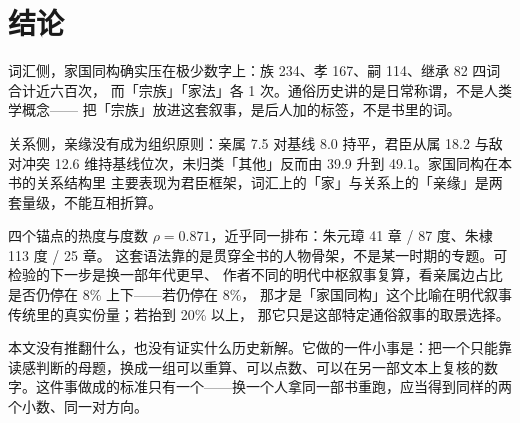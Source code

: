 \section{结论}

词汇侧，家国同构确实压在极少数字上：族 234、孝 167、嗣 114、继承 82 四词合计近六百次，
而「宗族」「家法」各 1 次。通俗历史讲的是日常称谓，不是人类学概念——
把「宗族」放进这套叙事，是后人加的标签，不是书里的词。

关系侧，亲缘没有成为组织原则：亲属 7.5 对基线 8.0 持平，君臣从属 18.2 与敌对冲突 12.6
维持基线位次，未归类「其他」反而由 39.9 升到 49.1。家国同构在本书的关系结构里
主要表现为君臣框架，词汇上的「家」与关系上的「亲缘」是两套量级，不能互相折算。

四个锚点的热度与度数 $\rho=0.871$，近乎同一排布：朱元璋 41 章 / 87 度、朱棣 113 度 / 25 章。
这套语法靠的是贯穿全书的人物骨架，不是某一时期的专题。可检验的下一步是换一部年代更早、
作者不同的明代中枢叙事复算，看亲属边占比是否仍停在 8\% 上下——若仍停在 8\%，
那才是「家国同构」这个比喻在明代叙事传统里的真实份量；若抬到 20\% 以上，
那它只是这部特定通俗叙事的取景选择。

本文没有推翻什么，也没有证实什么历史新解。它做的一件小事是：把一个只能靠读感判断的母题，换成一组可以重算、可以点数、可以在另一部文本上复核的数字。这件事做成的标准只有一个——换一个人拿同一部书重跑，应当得到同样的两个小数、同一对方向。
